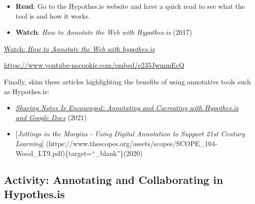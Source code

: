 \documentclass[
  letterpaper,
  DIV=11,
  numbers=noendperiod]{scrreprt}
\providecommand{\tightlist}{%
  \setlength{\itemsep}{0pt}\setlength{\parskip}{0pt}}\usepackage{longtable,booktabs,array}
\begin{document}
\begin{tcolorbox}[enhanced jigsaw, toprule=.15mm, colback=white, colframe=quarto-callout-note-color-frame, bottomtitle=1mm, leftrule=.75mm, coltitle=black, titlerule=0mm, rightrule=.15mm, colbacktitle=quarto-callout-note-color!10!white, left=2mm, title={Learning Activity}, opacitybacktitle=0.6, opacityback=0, breakable, toptitle=1mm, arc=.35mm, bottomrule=.15mm]

\begin{itemize}
\tightlist
\item
  \textbf{Read}: Go to the Hypothes.is website and have a quick read to
  see what the tool is and how it works.
\item
  \textbf{Watch}: \emph{How to Annotate the Web with Hypothes.is} (2017)
\end{itemize}

\href{https://www.youtube.com/watch?v=e235JwmmEcQ}{Watch: \emph{How to
Annotate the Web with hypothes.is}}

\url{https://www.youtube-nocookie.com/embed/e235JwmmEcQ}

Finally, skim these articles highlighting the benefits of using
annotative tools such as Hypothes.is:

\begin{itemize}
\tightlist
\item
  \href{https://twu.idm.oclc.org/login?url=https://search.ebscohost.com/login.aspx?direct=true&db=edsdoj&AN=edsdoj.12d6cddd34714c51bc1f6f8d6d9dea39&site=eds-live&scope=site}{\emph{Sharing
  Notes Is Encouraged: Annotating and Cocreating with Hypothes.is and
  Google Docs}} (2021)
\item
  {[}\emph{Jottings in the Margins - Using Digital Annotation to Support
  21st Century Learning}{]}
  (https://www.thescopes.org/assets/scopes/SCOPE\_104-Wood\_LT9.pdf)\{target=``\_blank''\}(2020)
\end{itemize}

\end{tcolorbox}

\subsection{Activity: Annotating and Collaborating in
Hypothes.is}\label{activity-annotating-and-collaborating-in-hypothes.is}
\end{document}
